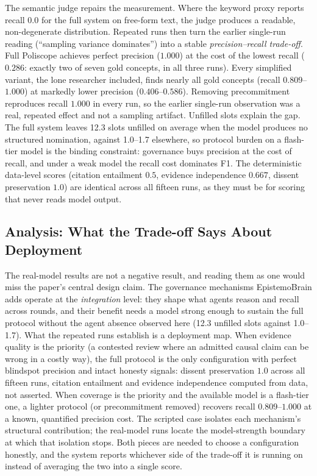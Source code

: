 The semantic judge repairs the measurement. Where the keyword proxy reports
recall 0.0 for the full system on free-form text, the judge produces a
readable, non-degenerate distribution. Repeated runs then turn the earlier
single-run reading (``sampling variance dominates'') into a stable
\emph{precision--recall trade-off}. Full Poliscope achieves perfect precision
($1.000$) at the cost of the lowest recall ($0.286$: exactly two of seven
gold concepts, in all three runs). Every simplified variant, the lone
researcher included, finds nearly all gold concepts (recall
$0.809$--$1.000$) at markedly lower precision ($0.406$--$0.586$). Removing
precommitment reproduces recall $1.000$ in every run, so the earlier
single-run observation was a real, repeated effect and not a sampling
artifact. Unfilled slots explain the gap. The full system leaves 12.3 slots
unfilled on average when the model produces no structured nomination, against
1.0--1.7 elsewhere, so protocol burden on a flash-tier model is the binding
constraint: governance buys precision at the cost of recall, and under a weak
model the recall cost dominates F1. The deterministic data-level scores
(citation entailment $0.5$, evidence independence $0.667$, dissent
preservation $1.0$) are identical across all fifteen runs, as they must be
for scoring that never reads model output.

\subsection{Analysis: What the Trade-off Says About Deployment}

The real-model results are not a negative result, and reading them as one
would miss the paper's central design claim. The governance mechanisms
EpistemoBrain adds operate at the \emph{integration} level: they shape what
agents reason and recall across rounds, and their benefit needs a model
strong enough to sustain the full protocol without the agent absence observed
here (12.3 unfilled slots against 1.0--1.7). What the repeated runs
establish is a deployment map. When evidence quality is the priority (a
contested review where an admitted causal claim can be wrong in a costly
way), the full protocol is the only configuration with perfect blindspot
precision and intact honesty signals: dissent preservation $1.0$ across all
fifteen runs, citation entailment and evidence independence computed from
data, not asserted. When coverage is the priority and the available
model is a flash-tier one, a lighter protocol (or precommitment removed)
recovers recall $0.809$--$1.000$ at a known, quantified precision cost. The
scripted case isolates each mechanism's structural contribution; the
real-model runs locate the model-strength boundary at which that isolation
stops. Both pieces are needed to choose a configuration honestly, and the
system reports whichever side of the trade-off it is running on instead of
averaging the two into a single score.

